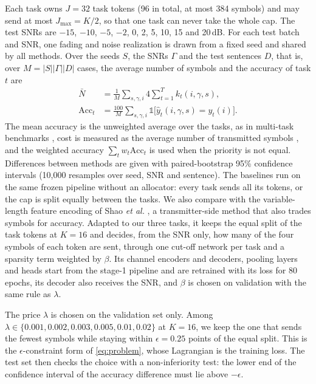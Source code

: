 \documentclass[conference]{IEEEtran}
\begin{document}
Each task owns $J{=}32$ task tokens (96 in total, at most 384
symbols) and may send at most $J_{\max}{=}K/2$, so that one task can
never take the whole cap. The test SNRs are $-15$, $-10$, $-5$, $-2$, 0, 2, 5, 10,
15 and 20\,dB. For each test batch and SNR, one fading and noise
realization is drawn from a fixed seed and shared by all methods. Over
the seeds $S$, the SNRs $\Gamma$ and the test sentences $D$, that is,
over $M = |S||\Gamma||D|$ cases, the average number of symbols and the
accuracy of task $t$ are
\begin{align}
  \bar N &= \frac{1}{M}\sum_{s,\gamma,i} 4\sum_{t=1}^{T} k_t(i,\gamma,s), \label{eq:symbols}\\
  \mathrm{Acc}_t &= \frac{100}{M}\sum_{s,\gamma,i} \mathds{1}\big[\hat y_t(i,\gamma,s) = y_t(i)\big]. \label{eq:acc}
\end{align}
The mean accuracy is the unweighted average over the tasks, as in
multi-task benchmarks \cite{wang2019glue}, cost is measured as the
average number of transmitted symbols \cite{shao2022learning}, and the
weighted accuracy $\sum_t w_t \mathrm{Acc}_t$ is used when the priority
is not equal. Differences between methods are given with
paired-bootstrap 95\% confidence intervals \cite{koehn2004statistical}
(10,000 resamples over seed, SNR and sentence). The baselines run on
the same frozen pipeline without an allocator: every task sends all
its tokens, or the cap is split equally between the tasks. We also
compare with the variable-length feature encoding of Shao \emph{et
al.} \cite{shao2022learning}, a transmitter-side method that also
trades symbols for accuracy. Adapted to our three tasks, it keeps the
equal split of the task tokens at $K{=}16$ and decides, from the SNR
only, how many of the four symbols of each token are sent, through one
cut-off network per task and a sparsity term weighted by $\beta$. Its
channel encoders and decoders, pooling layers and heads start from the
stage-1 pipeline and are retrained with its loss for 80 epochs, its
decoder also receives the SNR, and $\beta$ is chosen on validation
with the same rule as $\lambda$.

The price $\lambda$ is chosen on the validation set only. Among $\lambda \in \{0.001, 0.002, 0.003, 0.005, 0.01, 0.02\}$ at
$K{=}16$, we keep the one that sends the fewest symbols while staying
within $\epsilon{=}0.25$ points of the equal split. This is the
$\epsilon$-constraint form of \eqref{eq:problem}, whose Lagrangian is
the training loss. The test set then checks the choice with a
non-inferiority test: the lower end of the confidence interval of the
accuracy difference must lie above $-\epsilon$.
\end{document}
